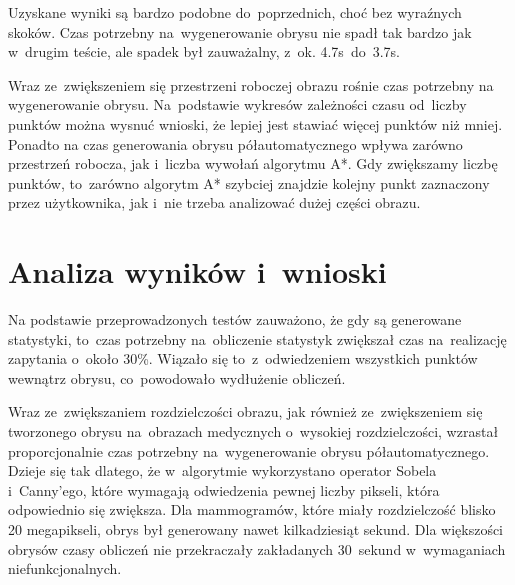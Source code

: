 \documentclass[a4paper,11pt,twoside,openright]{report}
\theoremstyle{definition}
\begin{document}
Uzyskane wyniki są bardzo podobne do~poprzednich, choć bez wyraźnych skoków.
Czas potrzebny na~wygenerowanie obrysu nie spadł tak bardzo jak w~drugim teście,
ale spadek był zauważalny, z~ok. 4.7s~do~3.7s. 

Wraz ze~zwiększeniem się przestrzeni roboczej obrazu rośnie czas potrzebny na
wygenerowanie obrysu. Na~podstawie wykresów zależności czasu od~liczby punktów
można wysnuć wnioski, że lepiej jest stawiać więcej punktów niż mniej. Ponadto na czas generowania
obrysu półautomatycznego wpływa zarówno przestrzeń robocza, jak i~liczba wywołań algorytmu A*. Gdy zwiększamy
liczbę punktów, to~zarówno algorytm A* szybciej znajdzie kolejny punkt zaznaczony przez użytkownika, jak i~nie
trzeba analizować dużej części obrazu.

\section {Analiza wyników i~wnioski}


Na podstawie przeprowadzonych testów
zauważono, że gdy są generowane statystyki, to~czas potrzebny na~obliczenie statystyk
zwiększał czas na~realizację zapytania o~około 30\%. Wiązało się to~z~odwiedzeniem
wszystkich punktów wewnątrz obrysu, co~powodowało wydłużenie obliczeń.

Wraz ze~zwiększaniem rozdzielczości obrazu, jak również ze~zwiększeniem się
tworzonego obrysu na~obrazach medycznych o~wysokiej rozdzielczości, wzrastał proporcjonalnie
czas potrzebny na~wygenerowanie obrysu półautomatycznego. Dzieje się tak dlatego,
że w~algorytmie wykorzystano operator Sobela i~Canny'ego, które wymagają odwiedzenia
pewnej liczby pikseli, która odpowiednio się zwiększa. Dla mammogramów, które miały rozdzielczość
blisko 20 megapikseli, obrys był generowany nawet kilkadziesiąt sekund. Dla większości obrysów
czasy obliczeń nie przekraczały zakładanych 30~sekund w~wymaganiach niefunkcjonalnych.
\end{document}
